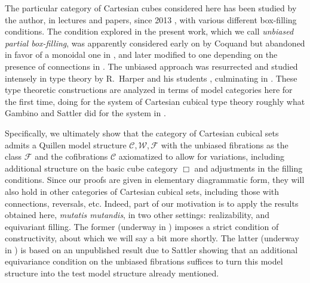 \documentclass[11pt,reqno]{amsart}
\newcommand{\CC}{\ensuremath{\mathcal{C}}}
\newcommand{\WW}{\ensuremath{\mathcal{W}}}
\newcommand{\FF}{\ensuremath{\mathcal{F}}}
\theoremstyle{remark}
\theoremstyle{definition}
\begin{document}
The particular category of Cartesian cubes considered here has been studied by the author, in lectures and papers, since 2013 \cite{Awodey:cubical-model,awodey19cmu}, with various different box-filling conditions.  The condition explored in the present work, which we call \emph{unbiased partial box-filling}, was apparently considered early on by Coquand \cite{Coq:cartesian} but abandoned in favor of a monoidal one in \cite{BCH}, and later modified to one depending on the presence of connections in \cite{CCHM:2018ctt}.  The unbiased approach was resurrected and studied intensely in type theory by R.~Harper and his students \cite{BL:2014,AngiuliHarperWilson17,AngiuliFavoniaHarper18,Angiuli:2019}, culminating in \cite{ABCHFL}.   These type theoretic constructions are analyzed in terms of model categories here for the first time, doing for the system of Cartesian cubical type theory roughly what Gambino and Sattler \cite{GS,Sattler:2017ee} did for the system in \cite{CCHM:2018ctt}.%

Specifically, we ultimately show that the category of Cartesian cubical sets admits a Quillen model structure $\CC, \WW, \FF$ with the unbiased fibrations as the class $\FF$ and the cofibrations $\CC$ axiomatized to allow for variations, including additional structure on the basic cube category $\Box$ and adjustments in the filling conditions.  Since our proofs are given in elementary diagrammatic form, they will also hold in other categories of Cartesian cubical sets, including those with connections, reversals, etc.  Indeed, part of our motivation is to apply the results obtained here, \emph{mutatis mutandis}, in two other settings: realizability, and equivariant filling.  The former (underway in \cite{AAFS}) imposes a strict condition of constructivity, about which we will say a bit more shortly.   The latter (underway in \cite{ACCRS}) is based on an unpublished result due to Sattler showing that an additional equivariance condition on the unbiased fibrations suffices to turn this model structure into the test model structure already mentioned.  
\end{document}
